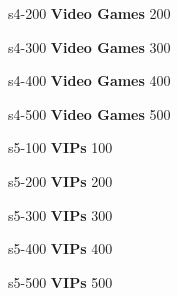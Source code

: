 \documentclass{beamer}
\def \fourthcat {\textbf{Video Games}}
\def \fifthcat {\textbf{VIPs}}
\begin{document}
	\content
	{s4-200}
	{\fourthcat}
	{200}{
    \db
	}


	\content
	{s4-300}
	{\fourthcat}
	{300}{
    \dc
	}


	\content
	{s4-400}
	{\fourthcat}
	{400}{
    \dd
	}


	\content
	{s4-500}
	{\fourthcat}
	{500}{
    \de
	}


	\content
	{s5-100}
	{\fifthcat}
	{100}{
    \ea
	}


	\content
	{s5-200}
	{\fifthcat}
	{200}{
    \eb
	}


	\content
	{s5-300}
	{\fifthcat}
	{300}{
    \ec
	}


	\content
	{s5-400}
	{\fifthcat}
	{400}{
    \ed
	}


	\content
	{s5-500}
	{\fifthcat}
	{500}{
    \ee
	}
\end{document}
